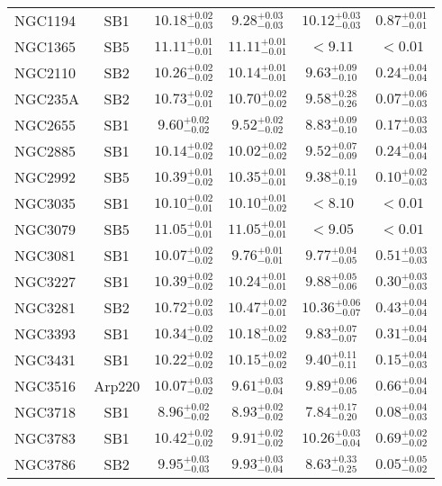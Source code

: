 \documentclass[onecolumn]{mn2e}
\begin{document}
{\begin{center}
\begin{longtable}{lccccc}
NGC1194 & SB1 & $10.18_{-0.03}^{+0.02}$ & $9.28_{-0.03}^{+0.03}$ & $10.12_{-0.03}^{+0.03}$ &$0.87_{-0.01}^{+0.01}$ \\
NGC1365 & SB5 & $11.11_{-0.01}^{+0.01}$ & $11.11_{-0.01}^{+0.01}$ & $<9.11$ &$<0.01$ \\
NGC2110 & SB2 & $10.26_{-0.02}^{+0.02}$ & $10.14_{-0.01}^{+0.01}$ & $9.63_{-0.10}^{+0.09}$ &$0.24_{-0.04}^{+0.04}$ \\
NGC235A & SB2 & $10.73_{-0.01}^{+0.02}$ & $10.70_{-0.02}^{+0.02}$ & $9.58_{-0.26}^{+0.28}$ &$0.07_{-0.03}^{+0.06}$ \\
NGC2655 & SB1 & $9.60_{-0.02}^{+0.02}$ & $9.52_{-0.02}^{+0.02}$ & $8.83_{-0.10}^{+0.09}$ &$0.17_{-0.03}^{+0.03}$ \\
NGC2885 & SB1 & $10.14_{-0.02}^{+0.02}$ & $10.02_{-0.02}^{+0.02}$ & $9.52_{-0.09}^{+0.07}$ &$0.24_{-0.04}^{+0.04}$ \\
NGC2992 & SB5 & $10.39_{-0.02}^{+0.01}$ & $10.35_{-0.01}^{+0.01}$ & $9.38_{-0.19}^{+0.11}$ &$0.10_{-0.03}^{+0.02}$ \\
NGC3035 & SB1 & $10.10_{-0.01}^{+0.02}$ & $10.10_{-0.02}^{+0.01}$ & $<8.10$ &$<0.01$ \\
NGC3079 & SB5 & $11.05_{-0.01}^{+0.01}$ & $11.05_{-0.01}^{+0.01}$ & $<9.05$ &$<0.01$ \\
NGC3081 & SB1 & $10.07_{-0.02}^{+0.02}$ & $9.76_{-0.01}^{+0.01}$ & $9.77_{-0.05}^{+0.04}$ &$0.51_{-0.03}^{+0.03}$ \\
NGC3227 & SB1 & $10.39_{-0.02}^{+0.02}$ & $10.24_{-0.01}^{+0.01}$ & $9.88_{-0.06}^{+0.05}$ &$0.30_{-0.03}^{+0.03}$ \\
NGC3281 & SB2 & $10.72_{-0.03}^{+0.02}$ & $10.47_{-0.01}^{+0.02}$ & $10.36_{-0.07}^{+0.06}$ &$0.43_{-0.04}^{+0.04}$ \\
NGC3393 & SB1 & $10.34_{-0.02}^{+0.02}$ & $10.18_{-0.02}^{+0.02}$ & $9.83_{-0.07}^{+0.07}$ &$0.31_{-0.04}^{+0.04}$ \\
NGC3431 & SB1 & $10.22_{-0.02}^{+0.02}$ & $10.15_{-0.02}^{+0.02}$ & $9.40_{-0.11}^{+0.11}$ &$0.15_{-0.03}^{+0.04}$ \\
NGC3516 & Arp220 & $10.07_{-0.02}^{+0.03}$ & $9.61_{-0.04}^{+0.03}$ & $9.89_{-0.05}^{+0.06}$ &$0.66_{-0.04}^{+0.04}$ \\
NGC3718 & SB1 & $8.96_{-0.02}^{+0.02}$ & $8.93_{-0.02}^{+0.02}$ & $7.84_{-0.20}^{+0.17}$ &$0.08_{-0.03}^{+0.04}$ \\
NGC3783 & SB1 & $10.42_{-0.02}^{+0.02}$ & $9.91_{-0.02}^{+0.02}$ & $10.26_{-0.04}^{+0.03}$ &$0.69_{-0.02}^{+0.02}$ \\
NGC3786 & SB2 & $9.95_{-0.03}^{+0.03}$ & $9.93_{-0.04}^{+0.03}$ & $8.63_{-0.25}^{+0.33}$ &$0.05_{-0.02}^{+0.05}$ \\

\end{longtable}
\end{center}}
\end{document}
